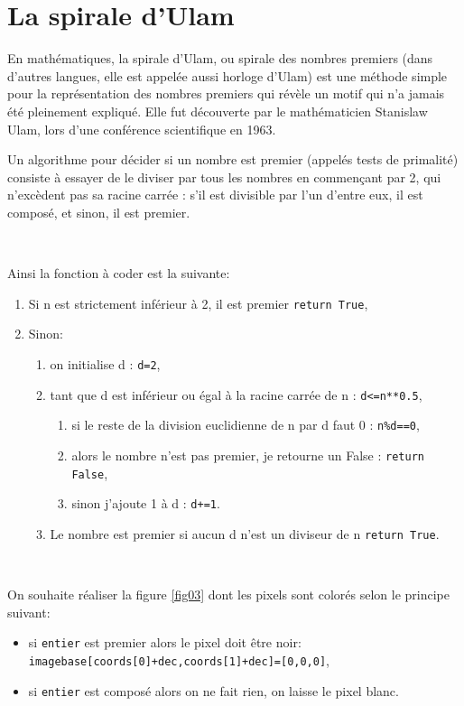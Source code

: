 \section{La spirale d'Ulam}

En mathématiques, la spirale d'Ulam, ou spirale des nombres premiers (dans d'autres langues, elle est appelée aussi horloge d'Ulam) est une méthode simple pour la représentation des nombres premiers qui révèle un motif qui n'a jamais été pleinement expliqué. Elle fut découverte par le mathématicien Stanislaw Ulam, lors d'une conférence scientifique en 1963. 

\newpage

Un algorithme pour décider si un nombre est premier (appelés tests de primalité) consiste à essayer de le diviser par tous les nombres en commençant par 2, qui n'excèdent pas sa racine carrée : s'il est divisible par l'un d'entre eux, il est composé, et sinon, il est premier.

~\

Ainsi la fonction à coder est la suivante:
\begin{enumerate}
\item Si n est strictement inférieur à 2, il est premier \texttt{return True},
\item Sinon:
\begin{enumerate}
\item on initialise d : \texttt{d=2},
\item tant que d est inférieur ou égal à la racine carrée de n : \texttt{d<=n**0.5},
\begin{enumerate}
\item si le reste de la division euclidienne de n par d faut 0 : \texttt{n\%d==0},
\item alors le nombre n'est pas premier, je retourne un False : \texttt{return False},
\item sinon j'ajoute 1 à d : \texttt{d+=1}.
\end{enumerate}
\item Le nombre est premier si aucun d n'est un diviseur de n \texttt{return True}.
\end{enumerate}
\end{enumerate}


~\

On souhaite réaliser la figure \ref{fig03} dont les pixels sont colorés selon le principe suivant:
\begin{itemize}
 \item si \texttt{entier} est premier alors le pixel doit être noir:\\ \texttt{imagebase[coords[0]+dec,coords[1]+dec]=[0,0,0]},
 \item si \texttt{entier} est composé alors on ne fait rien, on laisse le pixel blanc.
\end{itemize}


